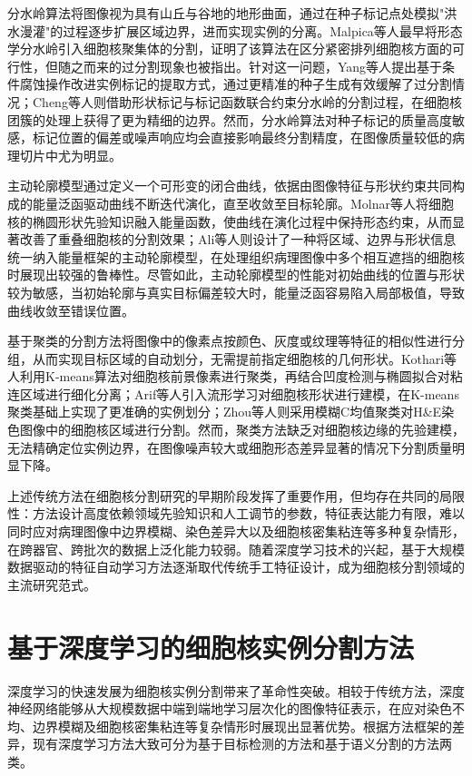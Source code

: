 \documentclass{sufethesismas}
\begin{document}
分水岭算法将图像视为具有山丘与谷地的地形曲面，通过在种子标记点处模拟"洪水漫灌"的过程逐步扩展区域边界，进而实现实例的分离\cite{Vincent1991}。Malpica等人\cite{Malpica1997}最早将形态学分水岭引入细胞核聚集体的分割，证明了该算法在区分紧密排列细胞核方面的可行性，但随之而来的过分割现象也被指出。针对这一问题，Yang等人\cite{Yang2006}提出基于条件腐蚀操作改进实例标记的提取方式，通过更精准的种子生成有效缓解了过分割情况；Cheng等人\cite{Cheng2008}则借助形状标记与标记函数联合约束分水岭的分割过程，在细胞核团簇的处理上获得了更为精细的边界。然而，分水岭算法对种子标记的质量高度敏感，标记位置的偏差或噪声响应均会直接影响最终分割精度，在图像质量较低的病理切片中尤为明显。

主动轮廓模型通过定义一个可形变的闭合曲线，依据由图像特征与形状约束共同构成的能量泛函驱动曲线不断迭代演化，直至收敛至目标轮廓\cite{Bamford1998}。Molnar等人\cite{Molnar2016}将细胞核的椭圆形状先验知识融入能量函数，使曲线在演化过程中保持形态约束，从而显著改善了重叠细胞核的分割效果；Ali等人\cite{Ali2012}则设计了一种将区域、边界与形状信息统一纳入能量框架的主动轮廓模型，在处理组织病理图像中多个相互遮挡的细胞核时展现出较强的鲁棒性。尽管如此，主动轮廓模型的性能对初始曲线的位置与形状较为敏感，当初始轮廓与真实目标偏差较大时，能量泛函容易陷入局部极值，导致曲线收敛至错误位置。

基于聚类的分割方法将图像中的像素点按颜色、灰度或纹理等特征的相似性进行分组，从而实现目标区域的自动划分，无需提前指定细胞核的几何形状。Kothari等人\cite{Kothari2009}利用K-means算法对细胞核前景像素进行聚类，再结合凹度检测与椭圆拟合对粘连区域进行细化分离；Arif等人\cite{Arif2007}引入流形学习对细胞核形状进行建模，在K-means聚类基础上实现了更准确的实例划分；Zhou等人\cite{ZhouX2005}则采用模糊C均值聚类对H\&E染色图像中的细胞核区域进行分割。然而，聚类方法缺乏对细胞核边缘的先验建模，无法精确定位实例边界，在图像噪声较大或细胞形态差异显著的情况下分割质量明显下降。

上述传统方法在细胞核分割研究的早期阶段发挥了重要作用，但均存在共同的局限性：方法设计高度依赖领域先验知识和人工调节的参数，特征表达能力有限，难以同时应对病理图像中边界模糊、染色差异大以及细胞核密集粘连等多种复杂情形，在跨器官、跨批次的数据上泛化能力较弱。随着深度学习技术的兴起，基于大规模数据驱动的特征自动学习方法逐渐取代传统手工特征设计，成为细胞核分割领域的主流研究范式。

\section{基于深度学习的细胞核实例分割方法}

深度学习的快速发展为细胞核实例分割带来了革命性突破。相较于传统方法，深度神经网络能够从大规模数据中端到端地学习层次化的图像特征表示，在应对染色不均、边界模糊及细胞核密集粘连等复杂情形时展现出显著优势。根据方法框架的差异，现有深度学习方法大致可分为基于目标检测的方法和基于语义分割的方法两类。
\end{document}
